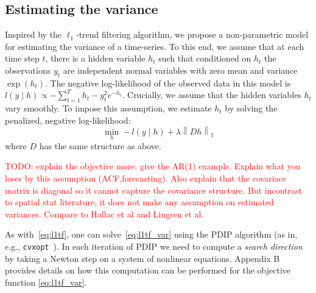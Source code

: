 \documentclass{article}
\newcommand{\attn}[1]{\textcolor{red}{TODO: #1}}
\newcommand{\given}{\;\vert\;}
\newcommand{\norm}[1]{\left\lVert #1 \right\rVert}
\begin{document}

\subsection{Estimating the variance}
\label{sec:l1tf_var}


Inspired by the $\ell_1$-trend filtering algorithm, we propose a
non-parametric model for estimating the variance of a time-series. To
this end, we assume that at each time step $t$, there is a hidden
variable $h_t$ such that conditioned on $h_t$ the observations $y_t$
are independent normal variables with zero mean and variance
$\exp(h_t)$. The negative log-likelihood of the observed data in this
model is $l(y\given h) \propto -\sum_{t=1}^T h_t - y_t^2e^{-h_t}$. Crucially,
we assume that the hidden variables $h_t$ vary smoothly. To impose
this assumption, we estimate $h_t$ by solving the penalized, negative
log-likelihood: 
\begin{equation}
\min_h -l(y\given h)+\lambda \norm{ Dh }_1
\label{eq:l1tf_var}
\end{equation}
 where $D$ has the same structure as above.

\attn{explain the objective more. give the AR(1) example. Explain what
  you loses by this assumption (ACF,forecasting). Also explain that
  the covariace matrix is diagonal so it cannot capture the covariance
  structure. But incontrast to spatial stat literature, it does not
  make any assumption on estimated variances. Compare to Hallac et al
  and Lingren et al.} 

As with~\eqref{eq:l1tf}, one can solve~\eqref{eq:l1tf_var} using the
PDIP algorithm (as in, e.g.,
\texttt{cvxopt}~\citep{andersen_cvxopt:_2013}). In each iteration of PDIP we need to compute a \textit{search direction} by taking a Newton step on a system of nonlinear equations. Appendix B provides details on how this computation can be performed for the objective function \ref{eq:l1tf_var}.
\end{document}
